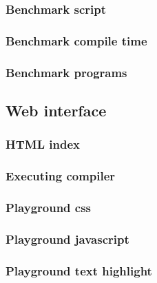 \subsubsection{Benchmark script}


\subsubsection{Benchmark compile time}


\subsubsection{Benchmark programs} \label{sec:benchmark-programs}






\subsection{Web interface}

\subsubsection{HTML index}


\subsubsection{Executing compiler}


\subsubsection{Playground css}


\subsubsection{Playground javascript}


\subsubsection{Playground text highlight}
